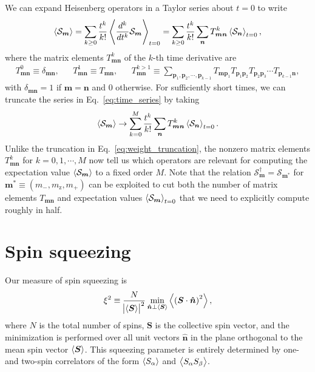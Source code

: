 \documentclass[aps,11pt,notitlepage,nofootinbib,longbibliography]{revtex4-1}
\newcommand{\f}[2]{\dfrac{#1}{#2}} %
\newcommand{\p}[1]{\left(#1\right)} %
\renewcommand{\v}{\bm} %
\newcommand{\uv}[1]{\v{\hat{#1}}} %
\renewcommand{\c}{\cdot} %
\newcommand{\bk}{\Braket} %
\renewcommand{\S}{\mathcal{S}}
\newcommand{\z}{\text{z}}
\newcommand{\1}{\mathds{1}}
\begin{document}
We can expand Heisenberg operators in a Taylor series about $t=0$ to
write
\begin{align}
  \bk{\S_{\v m}}
  = \sum_{k\ge0} \f{t^k}{k!} \bk{\f{d^k}{dt^k} \S_{\v m}}_{t=0}
  = \sum_{k\ge0} \f{t^k}{k!}
  \sum_{\v n} T^k_{\v m\v n} \bk{\S_{\v n}}_{t=0},
  \label{eq:time_series}
\end{align}
where the matrix elements $T^k_{\v m\v n}$ of the $k$-th time
derivative are
\begin{align}
  T^0_{\v m\v n} \equiv \delta_{\v m\v n},
  &&
  T^1_{\v m\v n} \equiv T_{\v m\v n},
  &&
  T^{k>1}_{\v m\v n}
  \equiv \sum_{\v p_1,\v p_2,\cdots,\v p_{k-1}}
  T_{\v m\v p_1} T_{\v p_1\v p_2} T_{\v p_2\v p_3}
  \cdots T_{\v p_{k-1}\v n},
\end{align}
with $\delta_{\v m\v n}=1$ if $\v m=\v n$ and 0 otherwise.  For
sufficiently short times, we can truncate the series in
Eq.~\eqref{eq:time_series} by taking
\begin{align}
  \bk{\S_{\v m}}
  \to \sum_{k=0}^M \f{t^k}{k!}
  \sum_{\v n} T^k_{\v m\v n} \bk{\S_{\v n}}_{t=0}.
\end{align}
Unlike the truncation in Eq.~\eqref{eq:weight_truncation}, the nonzero
matrix elements $T^k_{\v m\v n}$ for $k=0,1,\cdots,M$ now tell us
which operators are relevant for computing the expectation value
$\bk{\S_{\v m}}$ to a fixed order $M$.  Note that the relation
$\S_{\v m}^\dag=\S_{\v m^*}$ for $\v m^*\equiv\p{m_-,m_\z,m_+}$ can be
exploited to cut both the number of matrix elements $T_{\v m\v n}$ and
expectation values $\bk{\S_{\v m}}_{t=0}$ that we need to explicitly
compute roughly in half.


\section{Spin squeezing}



Our measure of spin squeezing is
\begin{align}
  \xi^2 \equiv \f{N}{\abs{\bk{\v S}}^2}
  \min_{\uv n\perp\bk{\v S}} \bk{\p{\v S\c\uv n}^2},
  \label{eq:squeezing}
\end{align}
where $N$ is the total number of spins, $\v S$ is the collective spin
vector, and the minimization is performed over all unit vectors
$\uv n$ in the plane orthogonal to the mean spin vector $\bk{\v S}$.
This squeezing parameter is entirely determined by one- and two-spin
correlators of the form $\bk{S_\alpha}$ and $\bk{S_\alpha S_\beta}$.
\end{document}
